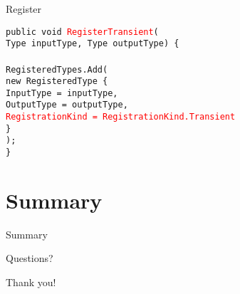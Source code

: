 \documentclass{beamer}
\newcommand{\code}[1]{{\texttt{#1}}}
\begin{document}
\begin{frame}{Register}
     \begin{large}
	\code{public void \textcolor{red}{RegisterTransient}(}\\ \quad
	\code{Type inputType, Type outputType) \{}\\ \quad
		\code{}\\ \quad
		\code{RegisteredTypes.Add(}\\ \qquad
		\code{new RegisteredType \{}\\ \qquad \quad
 		\code{InputType = inputType,}\\ \qquad \quad
		\code{OutputType = outputType,}\\ \qquad \quad
		\code{\textcolor{red}{RegistrationKind = RegistrationKind.Transient}}\\ \qquad
		\code{\}}\\ \quad
		\code{);}\\
	\code{\}}
     \end{large}
\end{frame}

\section{Summary}

\begin{frame}{}
	\begin{center}
		\Huge{Summary}
	\end{center}
\end{frame}

\begin{frame}{Questions?}
	\begin{center}
		\Huge{Thank you!}
	\end{center}
\end{frame}
\end{document}
